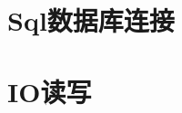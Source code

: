 \documentclass[math,code]{amznotes}
\begin{document}
	\tableofcontents
	
	\chapter{Sql数据库连接}
	
	\chapter{IO读写}
	
	
	\amzindex
\end{document}
